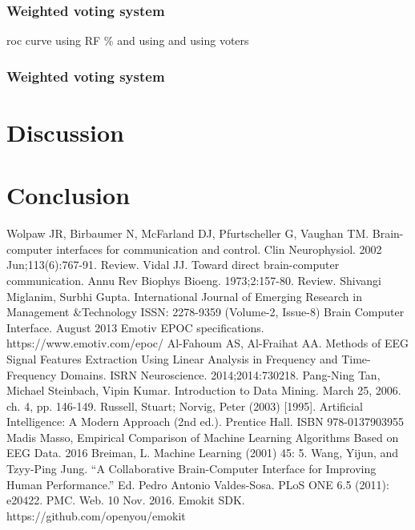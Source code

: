 \documentclass[12pt]{article}
\begin{document}
\subsubsection{Weighted voting system}

roc curve using RF \% and using and using voters

\subsubsection{Weighted voting system}

\newpage
\section{Discussion}

\newpage
\section{Conclusion}

\newpage
\begin{thebibliography}{9}

Wolpaw JR, Birbaumer N, McFarland DJ, Pfurtscheller G, Vaughan TM.
Brain-computer interfaces for communication and control. Clin Neurophysiol. 2002 
Jun;113(6):767-91. Review.
Vidal JJ. Toward direct brain-computer communication. Annu Rev Biophys Bioeng.
1973;2:157-80. Review.
Shivangi Miglanim, Surbhi Gupta.  International Journal of Emerging Research in Management \&Technology
ISSN: 2278-9359 (Volume-2, Issue-8)
Brain Computer Interface. 
August 2013
Emotiv EPOC specifications. https://www.emotiv.com/epoc/
Al-Fahoum AS, Al-Fraihat AA. Methods of EEG Signal Features Extraction Using Linear Analysis in Frequency and Time-Frequency Domains. ISRN Neuroscience. 2014;2014:730218.
Pang-Ning Tan, Michael Steinbach, Vipin Kumar. Introduction to Data Mining. March 25, 2006. ch. 4, pp. 146-149.
Russell, Stuart; Norvig, Peter (2003) [1995]. Artificial Intelligence: A Modern Approach (2nd ed.). Prentice Hall. ISBN 978-0137903955
Madis Masso, Empirical Comparison of Machine Learning Algorithms Based on EEG Data. 2016
Breiman, L. Machine Learning (2001) 45: 5. 
Wang, Yijun, and Tzyy-Ping Jung. ``A Collaborative Brain-Computer Interface for Improving Human Performance.'' Ed. Pedro Antonio Valdes-Sosa. PLoS ONE 6.5 (2011): e20422. PMC. Web. 10 Nov. 2016.
Emokit SDK. https://github.com/openyou/emokit
\end{thebibliography}
\end{document}

